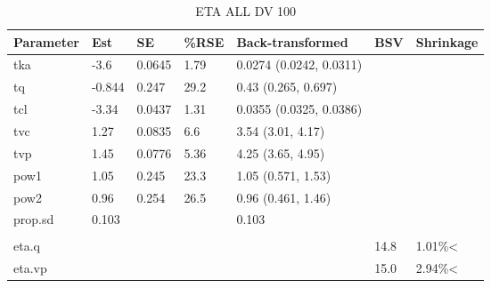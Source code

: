 \begin{table}
\centering\centering
\caption{ETA ALL DV 100}
\centering
\fontsize{8}{10}\selectfont
\begin{tabular}[t]{lllllll}
\toprule
\textbf{Parameter} & \textbf{Est} & \textbf{SE} & \textbf{\%RSE} & \textbf{Back-transformed} & \textbf{BSV} & \textbf{Shrinkage}\\
\midrule
tka & -3.6 & 0.0645 & 1.79 & 0.0274 (0.0242, 0.0311) &  & \\
\midrule
tq & -0.844 & 0.247 & 29.2 & 0.43 (0.265, 0.697) &  & \\
\midrule
tcl & -3.34 & 0.0437 & 1.31 & 0.0355 (0.0325, 0.0386) &  & \\
\midrule
tvc & 1.27 & 0.0835 & 6.6 & 3.54 (3.01, 4.17) &  & \\
\midrule
tvp & 1.45 & 0.0776 & 5.36 & 4.25 (3.65, 4.95) &  & \\
\midrule
pow1 & 1.05 & 0.245 & 23.3 & 1.05 (0.571, 1.53) &  & \\
\midrule
pow2 & 0.96 & 0.254 & 26.5 & 0.96 (0.461, 1.46) &  & \\
\midrule
prop.sd & 0.103 &  &  & 0.103 &  & \\
\midrule\\
eta.q &  &  &  &  & 14.8 & 1.01\%<\\
\midrule
eta.vp &  &  &  &  & 15.0 & 2.94\%<\\
\bottomrule
\end{tabular}
\end{table}